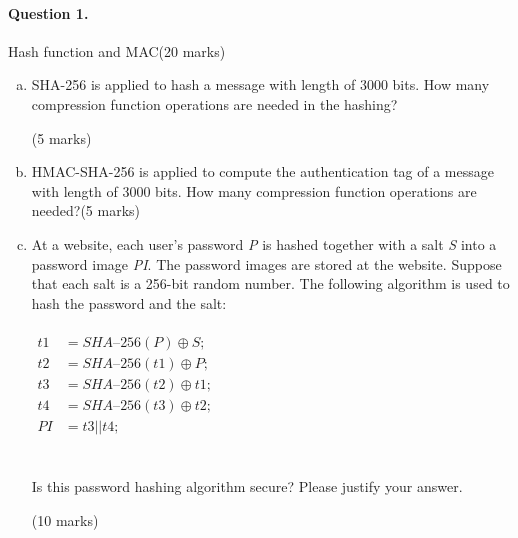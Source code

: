 \documentclass[12pt]{article}
\begin{document}
\paragraph{Question 1.}   Hash function and MAC\hfill (20 marks)
\begin{enumerate}[(a)]
    \item SHA-256 is applied to hash a message with length of 3000 bits. How many compression function operations are needed in the hashing?{\vspace{-0.8em}\begin{flushright} (5 marks)\end{flushright}}
    \item HMAC-SHA-256 is applied to compute the authentication tag of a message with length of 3000 bits. How many compression function operations are needed?\hfill (5 marks)
    \item At a website, each user's password \textit{P} is hashed together with a salt \textit{S} into a password image \textit{PI}. The password images are stored at the website. Suppose that each salt is a 256-bit random number. The following algorithm is used to hash the password and the salt:\\\\$\begin{aligned}
    t1&=\textit{SHA--}256(P)\oplus S;\\
    t2&=\textit{SHA--}256(t1)\oplus P;\\
    t3&=\textit{SHA--}256(t2)\oplus t1;
\\
t4&=\textit{SHA--}256(t3)\oplus t2;\\
PI&=t3||t4;
    \end{aligned}$\\\\\\
    Is this password hashing algorithm secure? Please justify your answer.{\vspace{-0.8em}\begin{flushright} (10 marks)\end{flushright}}
\end{enumerate}
\end{document}
